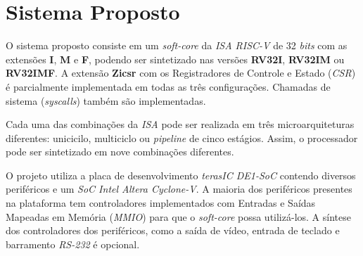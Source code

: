 \chapter{Sistema Proposto}\label{cap3_proposta}

{ O sistema proposto consiste em um \textit{soft-core} da \textit{ISA RISC-V}
    de 32 \textit{bits} com as extensões \textbf{I}, \textbf{M} e \textbf{F},
    podendo ser sintetizado nas versões \textbf{RV32I}, \textbf{RV32IM} ou
    \textbf{RV32IMF}. A extensão \textbf{Zicsr} com os Registradores de Controle
    e Estado (\textit{CSR}) é parcialmente implementada em todas as três
    configurações. Chamadas de sistema (\textit{syscalls}) também são implementadas.
}

{ Cada uma das combinações da \textit{ISA} pode ser realizada em três
    microarquiteturas diferentes: unicicilo, multiciclo ou \textit{pipeline} de
    cinco estágios. Assim, o processador pode ser sintetizado em nove
    combinações diferentes.
}

{ O projeto utiliza a placa de desenvolvimento \textit{terasIC DE1-SoC} contendo
    diversos periféricos e um \textit{SoC Intel Altera Cyclone-V}. A maioria dos
    periféricos presentes na plataforma tem controladores implementados com
    Entradas e Saídas Mapeadas em Memória (\textit{MMIO}) para que o
    \textit{soft-core} possa utilizá-los. A síntese dos controladores dos
    periféricos, como a saída de vídeo, entrada de teclado e barramento
    \textit{RS-232} é opcional.
}

